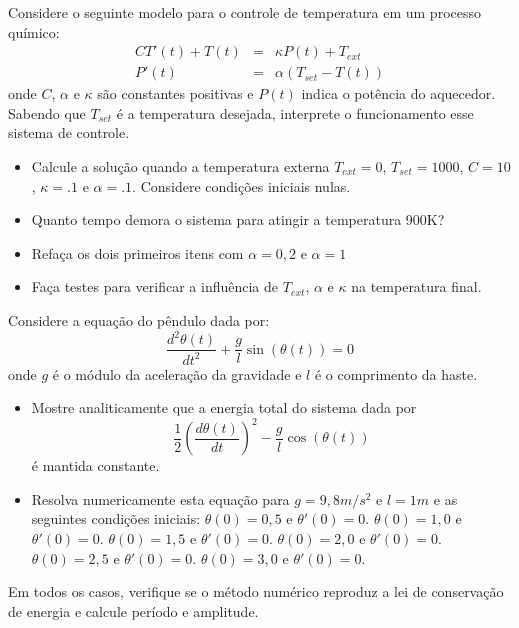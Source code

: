 \begin{exer} Considere o seguinte modelo para o controle de temperatura em um processo químico:
\begin{eqnarray*}
CT'(t)+T(t)&=&\kappa P(t)+T_{ext}\\
P'(t)&=&\alpha(T_{set}-T(t))
\end{eqnarray*}
onde $C$, $\alpha$ e $\kappa$ são constantes positivas e $P(t)$ indica o potência do aquecedor. Sabendo que $T_{set}$ é a temperatura desejada, interprete o funcionamento esse sistema de controle.
\begin{itemize}
\item Calcule a solução quando a temperatura externa $T_{ext}=0$, $T_{set}=1000$, $C=10$, $\kappa=.1$ e $\alpha=.1$. Considere condições iniciais nulas.
\item Quanto tempo demora o sistema para atingir a temperatura 900K?
\item Refaça os dois primeiros itens com $\alpha=0,2$ e $\alpha=1$
\item Faça testes para verificar a influência de $T_{ext}$, $\alpha$ e $\kappa$ na temperatura final.
\end{itemize}
\end{exer}

\begin{exer} Considere a equação do pêndulo dada por:
\begin{equation} \frac{d^2\theta(t)}{dt^2}+\frac{g}{l}\sin(\theta(t))=0 \end{equation}
onde $g$ é o módulo da aceleração da gravidade e $l$ é o comprimento da haste.
\begin{itemize}
\item Mostre analiticamente que a energia total do sistema dada por
\begin{equation} \frac{1}{2}\left(\frac{d\theta(t)}{dt}\right)^2-\frac{g}{l}\cos(\theta(t)) \end{equation}
é mantida constante.
\item Resolva numericamente esta equação para $g=9,8m/s^2$ e $l=1m$ e as seguintes condições iniciais:
\subitem $\theta(0)=0,5$ e $\theta'(0)=0$.
\subitem $\theta(0)=1,0$ e $\theta'(0)=0$.
\subitem $\theta(0)=1,5$ e $\theta'(0)=0$.
\subitem $\theta(0)=2,0$ e $\theta'(0)=0$.
\subitem $\theta(0)=2,5$ e $\theta'(0)=0$.
\subitem $\theta(0)=3,0$ e $\theta'(0)=0$.
\end{itemize}
Em todos os casos, verifique se o método numérico reproduz a lei de conservação de energia e calcule período e amplitude.
\end{exer}

